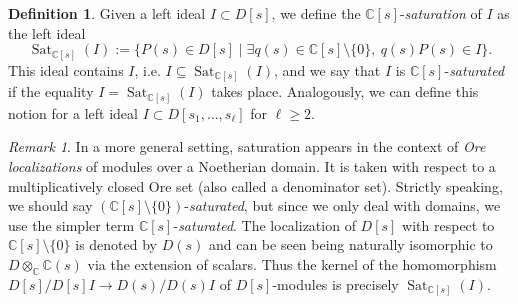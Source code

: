 \documentclass[a4paper,12pt]{amsart}
\theoremstyle{plain}
\theoremstyle{definition}
\newtheorem{defi}[theorem]{Definition}
\theoremstyle{remark}
\newtheorem{remark}[theorem]{Remark}
\def\CC{\mathbb{C}}
\DeclareMathOperator{\Sat}{Sat}
\begin{document}
\begin{defi}
Given a left ideal $I \subset D[s]$, we define the $\CC[s]$-\emph{saturation} of $I$  as the left ideal %
\[
\Sat_{\CC[s]}(I) := \{ P(s) \in D[s] \mid \exists q(s) \in \CC[s] \setminus \{0\}, \ q(s) P(s) \in I \}.
\]
This ideal contains $I$, i.e. $I \subseteq \Sat_{\CC[s]}(I)$, and we say that $I$ is $\CC[s]$-\emph{saturated} if the equality $I=\Sat_{\CC[s]}(I)$ takes place. Analogously, we can define this notion for a left ideal $I \subset D[s_1, \ldots, s_{\ell}]$ for $\ell \geq 2$.
\end{defi}

\begin{remark}
In a more general setting, saturation appears in the context of \emph{Ore localizations} of modules over a Noetherian domain. It is taken with respect to a multiplicatively closed Ore set (also called a denominator set). Strictly speaking, we should say $(\CC[s]\setminus\{0\})$-\emph{saturated}, but since we only deal with domains, we use the simpler term
$\CC[s]$-\emph{saturated}.
The localization of $D[s]$ with respect to $\CC[s]\setminus\{0\}$ is denoted by $D(s)$ and can be seen being naturally isomorphic to $D \otimes_{\CC} \CC(s)$ via the extension of scalars. Thus the kernel of the homomorphism $D[s]/D[s]I \to D(s)/D(s)I$ of $D[s]$-modules is precisely $\Sat_{\CC[s]}(I)$. %
\end{remark}
\end{document}
